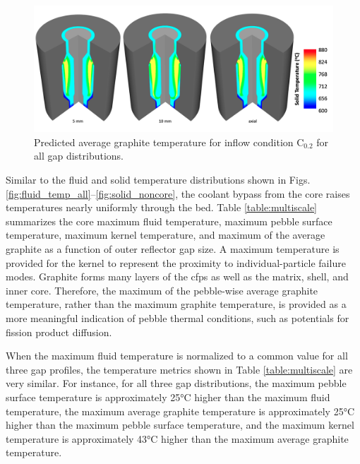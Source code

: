 \begin{figure}[h!]
\centering
\includegraphics[height=0.4\linewidth]{figs/graphite.png}
\caption{Predicted average graphite temperature for inflow condition C$_\text{0.2}$ for all gap distributions.}
\label{fig:graphite}
\end{figure}

Similar to the fluid and solid temperature distributions shown in Figs. \ref{fig:fluid_temp_all}--\ref{fig:solid_noncore}, the coolant bypass from the core raises temperatures nearly uniformly through the bed. Table \ref{table:multiscale} summarizes the core maximum fluid temperature, maximum pebble surface temperature, maximum kernel temperature, and maximum of the average graphite as a function of outer reflector gap size. A maximum temperature is provided for the kernel to represent the proximity to individual-particle failure modes. Graphite forms many layers of the \glspl{cfp} as well as the matrix, shell, and inner core. Therefore, the maximum of the pebble-wise average graphite temperature, rather than the maximum graphite temperature, is provided as a more meaningful indication of pebble thermal conditions, such as potentials for fission product diffusion.

When the maximum fluid temperature is normalized to a common value for all three gap profiles, the temperature metrics shown in Table \ref{table:multiscale} are very similar. For instance, for all three gap distributions, the maximum pebble surface temperature is approximately 25\si{\celsius} higher than the maximum fluid temperature, the maximum average graphite temperature is approximately 25\si{\celsius} higher than the maximum pebble surface temperature, and the maximum kernel temperature is approximately 43\si{\celsius} higher than the maximum average graphite temperature. 

